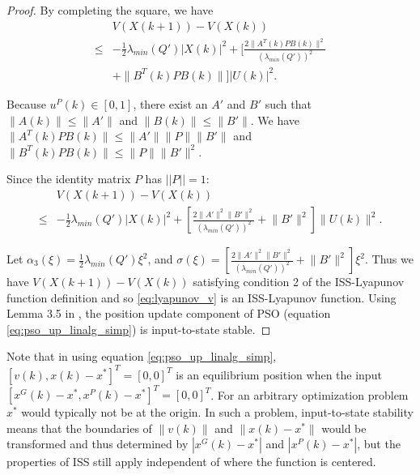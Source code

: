 \begin{mythm}
\begin{proof}
By completing the square, we have
\begin{equation}
\label{eq:lyapunov_delta4}
\begin{aligned}
& V( X(k+1) ) - V( X(k) ) \\
\leq & - \frac{1}{2} \lambda_{min}(Q') | X(k) |^{2} + [ \frac{2 \lVert A^{T}(k) P B(k) \rVert^{2}}{ ( \lambda_{min}(Q') )^{2} }  \\
& + \lVert B^{T}(k) P B(k) \rVert ] | U(k) |^{2}. 
\end{aligned}
\end{equation}

Because $ u^{P}(k) \in [0, 1] $, there exist an $ A' $ and $ B' $ such that $ \lVert A(k) \rVert \leq \lVert A' \rVert $ and $ \lVert B(k) \rVert \leq \lVert B' \rVert $.
We have $ \lVert A^{T}(k) P B(k) \rVert \leq \lVert A' \rVert \lVert P \rVert \lVert B' \rVert $ and $ \lVert B^{T}(k) P B(k) \rVert \leq \lVert P \rVert \lVert B' \rVert^{2} $.

Since the identity matrix $ P $ has $ || P || = 1 $:
\begin{equation}
\label{eq:lyapunov_delta5}
\begin{aligned}
& V( X(k+1) ) - V( X(k) ) \\
\leq & - \frac{1}{2} \lambda_{min}(Q') | X(k) |^{2} + [ \frac{2 \lVert A' \rVert^{2} \lVert B' \rVert^{2}}{ ( \lambda_{min}(Q') )^{2} } + \lVert B' \rVert^{2} ] \lVert U(k) \rVert^{2}.
\end{aligned}
\end{equation}

Let
$ \alpha_{3} ( \xi )= \frac{1}{2} \lambda_{min}(Q') \xi^{2} $,
and
$ \sigma ( \xi ) = [ \frac{2 \lVert A' \rVert^{2} \lVert B' \rVert^{2}}{ ( \lambda_{min}(Q') )^{2} } +  \lVert B' \rVert^{2} ] \xi^{2} $.
Thus we have $  V( X(k+1) ) - V( X(k) ) $ satisfying condition 2 of the ISS-Lyapunov function definition and
so \eqref{eq:lyapunov_v} is an ISS-Lyapunov function.
Using Lemma 3.5 in \cite{Jiang2001857}, the position update component of PSO (equation \eqref{eq:pso_up_linalg_simp}) is input-to-state stable.

\end{proof}
\end{mythm}

Note that in using equation \eqref{eq:pso_up_linalg_simp},
$ [ v(k), x(k) - x^{*} ]^{T} = [0, 0]^{T} $ is an equilibrium position when the input $ [ x^{G}(k) - x^{*} , x^{P}(k) - x^{*} ]^{T} = [0, 0]^{T} $.
For an arbitrary optimization problem $ x^{*} $ would typically not be at the origin. 
In such a problem, input-to-state stability means that the boundaries of $ \lVert v(k) \lVert $ and $ \lVert x(k) - x^{*} \rVert $ would be transformed and thus determined by $ | x^{G}(k) - x^{*} | $ and $ | x^{P}(k) - x^{*} | $,
but the properties of ISS still apply independent of where the function is centered.

